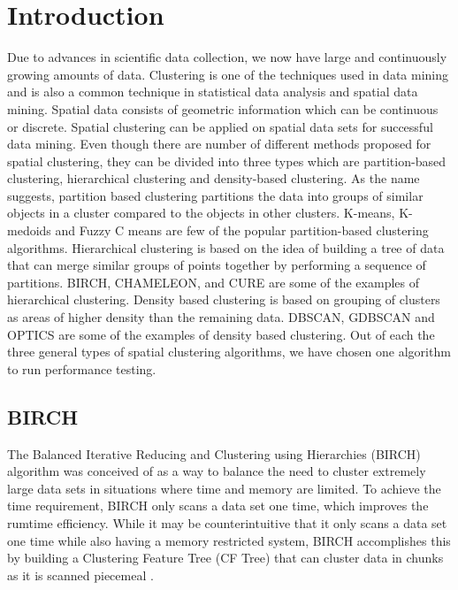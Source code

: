 \documentclass[conference, 10pt]{IEEEtran}
\begin{document}
\section{Introduction}
Due to advances in scientific data collection, we now have large and continuously growing amounts of data. Clustering is one of the techniques used in data mining and is also a common technique in statistical data analysis and spatial data mining. Spatial data consists of geometric information which can be continuous or discrete. Spatial clustering can be applied on spatial data sets for successful data mining. Even though there are number of different methods proposed for spatial clustering, they can be divided into three types which are partition-based clustering, hierarchical clustering and density-based clustering.  As the name suggests, partition based clustering partitions the data into groups of similar objects in a cluster compared to the objects in other clusters.  K-means, K-medoids and Fuzzy C means are few of the popular partition-based clustering algorithms.  Hierarchical clustering is based on the idea of building a tree of data that can merge similar groups of points together by performing a sequence of partitions. BIRCH, CHAMELEON, and CURE are some of the examples of hierarchical clustering.  Density based clustering is based on grouping of clusters as areas of higher density than the remaining data. DBSCAN, GDBSCAN and OPTICS are some of the examples of density based clustering. Out of each the three general types of spatial clustering algorithms, we have chosen one algorithm to run performance testing.

\subsection{BIRCH}

The Balanced Iterative Reducing and Clustering using Hierarchies (BIRCH) algorithm was conceived of as a way to balance the need to cluster extremely large data sets in situations where time and memory are limited. To achieve the time requirement, BIRCH only scans a data set one time, which improves the rumtime efficiency. While it may be counterintuitive that it only scans a data set one time while also having a memory restricted system, BIRCH accomplishes this by building a Clustering Feature Tree (CF Tree) that can cluster data in chunks as it is scanned piecemeal \cite{birch}.
\end{document}
